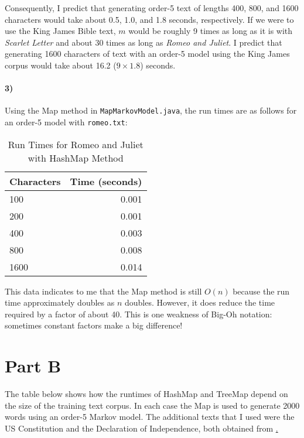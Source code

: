 \documentclass[12pt]{article}
\begin{document}
Consequently, I predict that generating order-5 text of lengths 400, 800, and 1600 characters would take about 0.5, 1.0, and 1.8 seconds, respectively. If we were to use the King James Bible text, $m$ would be roughly 9 times as long as it is with \emph{Scarlet Letter} and about 30 times as long as \emph{Romeo and Juliet}. I predict that generating 1600 characters of text with an order-5 model using the King James corpus would take about 16.2 ($9\times1.8$) seconds. 

\paragraph{3)} Using the Map method in \texttt{MapMarkovModel.java}, the run times are as follows for an order-5 model with \texttt{romeo.txt}:

\begin{table}[h]
\caption{Run Times for Romeo and Juliet with HashMap Method}
\begin{center}
\begin{tabular}{lr}
Characters & Time (seconds) \\
\hline
100 & 0.001 \\
200 & 0.001\\
400 & 0.003 \\
800 & 0.008 \\
1600 & 0.014 \\
\end{tabular}
\end{center}
\end{table}

This data indicates to me that the Map method is still $O(n)$ because the run time approximately doubles as $n$ doubles. However, it does reduce the time required by a factor of about 40. This is one weakness of Big-Oh notation: sometimes constant factors make a big difference! 

\section*{Part B}

The table below shows how the runtimes of HashMap and TreeMap depend on the size of the training text corpus. In each case the Map is used to generate 2000 words using an order-5 Markov model. The additional texts that I used were the US Constitution and the Declaration of Independence, both obtained from \href{http://www.usconstitution.net}.
\end{document}
